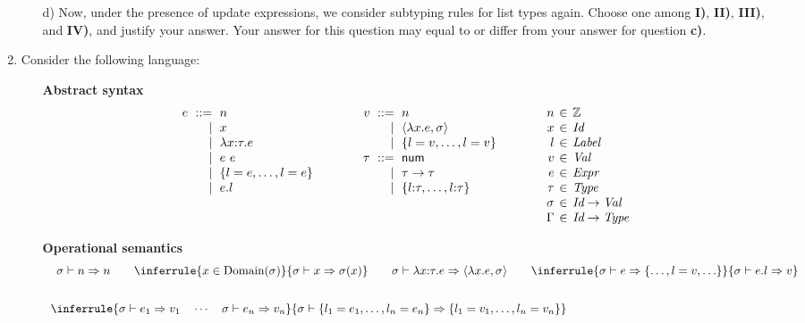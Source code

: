 \begin{enumerate}
\begin{itemize}
\item[d)] Now, under the presence of update expressions, we consider subtyping rules for list types again.
Choose one among \textbf{I)}, \textbf{II)}, \textbf{III)}, and \textbf{IV)}, and justify your answer.
Your answer for this question may equal to or differ from your answer for question \textbf{c)}.
\end{itemize}

\item Consider the following language:

\begin{itemize}
\item[] \textbf{Abstract syntax}
\[
\begin{array}{r@{\hskip6pt}r@{\hskip6pt}l@{\hskip40pt}
  r@{\hskip6pt}r@{\hskip6pt}l@{\hskip40pt}
  r@{\hskip4pt}c@{\hskip4pt}l}
  e &::=& n & v &::=& n & n &\in& \mathbb{Z} \\
  &|& x &&|& \clo{x}{e}{\sigma} & x &\in& \textit{Id} \\
  &|& \lambda x{:}\tau.e &&|& \{l=v,\ldots,l=v\} & l &\in& \textit{Label} \\
  &|& e\ e & \tau &::=& \textsf{num} & v &\in& \textit{Val} \\
  &|& \{l=e,\ldots,l=e\} &&|& \tau\rightarrow\tau & e &\in& \textit{Expr} \\
  &|& e.l &&|& \{l{:}\tau,\ldots,l{:}\tau\} & \tau &\in& \textit{Type} \\
  &&&&&& \sigma &\in& \textit{Id}\rightarrow \textit{Val} \\
  &&&&&& \Gamma &\in &\textit{Id}\rightarrow \textit{Type} \\
\end{array}
\]
\item[] \textbf{Operational semantics}
\[
\begin{array}{cc}
\multicolumn{2}{c}{\begin{array}{c@{\hskip20pt}c@{\hskip20pt}c@{\hskip20pt}c}
\sigma\vdash n\Rightarrow n
&
\inferrule
{ x\in\Dom{\sigma} }
{ \sigma\vdash x\Rightarrow \sigma(x) }
&
\sigma\vdash\lambda x{:}\tau.e\Rightarrow\clo{x}{e}{\sigma}
&
\inferrule
{ \sigma\vdash e\Rightarrow \{\ldots,l=v,\ldots\} }
{ \sigma\vdash {e}.{l}\Rightarrow v }
\end{array}}
\\[20pt]
\inferrule
{ \sigma\vdash e_1\Rightarrow v_1 \rulesep\cdots\rulesep \sigma\vdash
  e_n\Rightarrow v_n }
{ \sigma\vdash\{l_1=e_1,\ldots,l_n=e_n\}\Rightarrow\{l_1=v_1,\ldots,l_n=v_n\} }

\end{array}\]
\end{itemize}
\end{enumerate}

